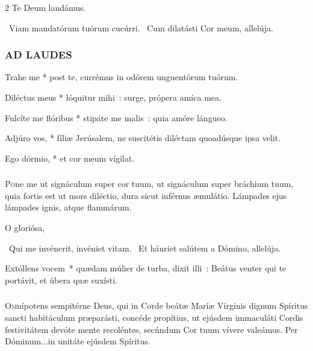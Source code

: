 \documentclass[9pt,twoside]{extarticle}
\begin{document}
\begin{multicols}{2}
Te Deum laudámus. 

~Viam mandatórum tuórum cucúrri. ~Cum dilatásti Cor meum, allelúja.

\subsubsection*{\center \normalfont \textsc{AD LAUDES}\\ \normalfont {}}

\smallskip
\indent {} Trahe me * post te, currémus in odórem unguentórum tuórum.


 Diléctus meus * lóquitur mihi~: surge, própera amíca mea.

 Fulcíte me flóribus * stipáte me malis~: quia amóre lángueo.

 Adjúro vos, * fíliæ Jerúsalem, ne suscitétis diléctam quoadúsque ipsa velit.

 Ego dórmio, * et cor meum vígilat.


\subsubsection*{\normalfont {}}
\lettrine{P}{o}ne me ut signáculum super cor tuum, ut signáculum super bráchium tuum, quia fortis est ut mors diléctio, dura sicut inférnus æmulátio. Lámpades ejus lámpades ignis, atque flammárum.

\smallskip
{} O gloriósa, 

~Qui me invénerit, invéniet vitam. ~Et háuriet salútem a Dómino, allelúja.

 Extóllens vocem~* quædam múlier de turba, dixit illi~: Beátus venter qui te portávit, et úbera quæ suxísti.

\subsubsection*{\center \normalfont {}}
\lettrine{O}{m}nípotens sempitérne Deus, qui in Corde beátæ Maríæ Vírginis dignum Spíritus sancti habitáculum præparásti, concéde propítius, ut ejúsdem immaculáti Cordis festivitátem devóte mente recoléntes, secúndum Cor tuum vívere valeámus. Per Dóminum...in unitáte ejúsdem Spíritus.


\end{multicols}
\end{document}
